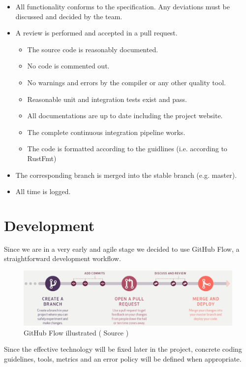 \begin{itemize}
    \item All functionality conforms to the specification. Any deviations must be discussed and decided by the team.
    \item A review is performed and accepted in a pull request.
        \begin{itemize}
            \item The source code is reasonably documented.
            \item No code is commented out.
            \item No warnings and errors by the compiler or any other quality tool.
            \item Reasonable unit and integration tests exist and pass.
            \item All documentations are up to date including the project website.
            \item The complete continuous integration pipeline works.
            \item The code is formatted according to the guidlines (i.e. according to RustFmt)
        \end{itemize}
    \item The corresponding branch is merged into the stable branch (e.g. master).
    \item All time is logged.
\end{itemize}

\section{Development}

Since we are in a very early and agile stage we decided to use GitHub Flow\cite{github-flow}, a straightforward development workflow.

\begin{figure}[H]
	\centering
	\includegraphics[width=0.85\linewidth]{resources/github_flow}
	\caption[Organigram]{GitHub Flow illustrated ( Source \cite{github-flow})}
	\label{fig:organigram}
\end{figure}


Since the effective technology will be fixed later in the project, concrete coding guidelines, tools, metrics and an error policy will be defined when appropriate.


